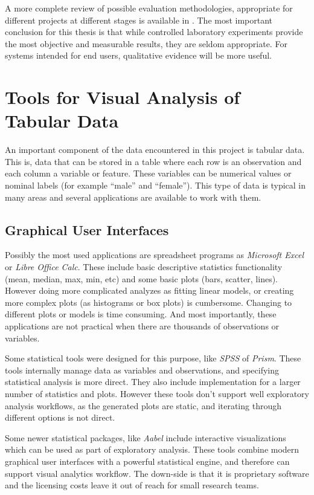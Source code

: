 A more complete review of possible evaluation methodologies, appropriate for different projects at different stages is available in \autocite{lam_seven_2011}. The most important conclusion for this thesis is that while controlled laboratory experiments provide the most objective and measurable results, they are seldom appropriate. For systems intended for end users, qualitative evidence will be more useful.


\section{Tools for Visual Analysis of Tabular Data}

An important component of the data encountered in this project is tabular data. This is, data that can be stored in a table where each row is an observation and each column a variable or feature. These variables can be numerical values or nominal labels (for example ``male'' and ``female''). This type of data is typical in many areas and several applications are available to work with them.

\subsection{Graphical User Interfaces}

Possibly the most used applications are spreadsheet programs as \emph{Microsoft Excel} or \emph{Libre Office Calc}. These  include basic descriptive statistics functionality (mean, median, max, min, etc) and some basic plots (bars, scatter, lines). However doing more complicated analyzes as fitting linear models, or creating more complex plots (as histograms or box plots) is cumbersome. Changing to different plots or models is time consuming. And most importantly, these applications are not practical when there are thousands of observations or variables. 


Some statistical tools were designed for this purpose, like \emph{SPSS} of \emph{Prism}. These tools internally manage data as variables and observations, and specifying statistical analysis is more direct. They also include implementation for a larger number of statistics and plots. However these tools don't support well exploratory analysis workflows, as the generated plots are static, and iterating through different options is not direct.


Some newer statistical packages, like \emph{Aabel} include interactive visualizations which can be used as part of exploratory analysis. These tools combine modern graphical user interfaces with a powerful statistical engine, and therefore can support visual analytics workflow. The down-side is that it is proprietary software and the licensing costs leave it out of reach for small research teams.	

